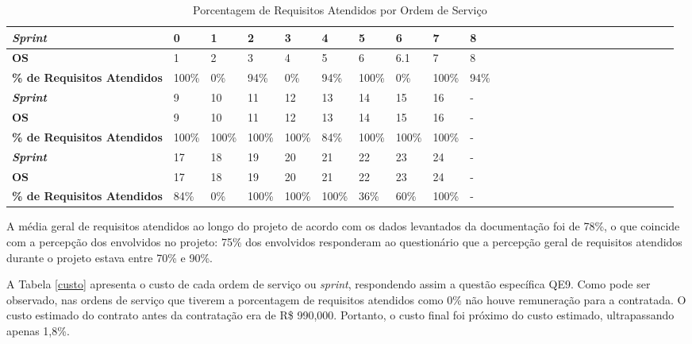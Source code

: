 \begin{table}[h]
\footnotesize
\center
\begin{tabular}{|l|l|l|l|l|l|l|l|l|l|l|l|l|l|l|l|l|l|l|l|l|l|l|l|l|l|}
\hline
\textbf{\textit{Sprint}} & 0   & 1 &  2 & 3 & 4 & 5 & 6 & 7 & 8  \\ \hline
\textbf{OS} & 1 &  2 & 3 & 4 & 5 & 6 & 6.1 & 7 & 8  \\ \hline
\textbf{\% de Requisitos Atendidos} & 100\% &  0\%    & 94\%    & 0\%    & 94\%         & 100\%        & 0\%       & 100\%                                                                                     & 94\%               \\ \hline \hline
\textbf{\textit{Sprint}} &  9 & 10 & 11 & 12 & 13 & 14 & 15 & 16  & -\\ \hline
\textbf{OS} &  9 & 10 & 11 & 12 & 13 & 14 & 15 & 16 & - \\ \hline
\textbf{\% de Requisitos Atendidos} &   100\%                                       & 100\%           & 100\%  & 100\% & 84\%         & 100\%         & 100\%       & 100\%  &-         \\ \hline \hline
\textbf{\textit{Sprint}} &  17 & 18 & 19 & 20 & 21 & 22 & 23 & 24  & -\\ \hline
\textbf{OS} &  17 & 18 & 19 & 20 & 21 & 22 & 23 & 24 & - \\ \hline
\textbf{\% de Requisitos Atendidos} &  84\%        & 0\%        & 100\%          & 100\% & 100\%     & 36\%      & 60\%        & 100\%          &-                                                                          \\ \hline

\end{tabular}
\caption{Porcentagem de Requisitos Atendidos por Ordem de Serviço}
		\label{porcentagemrequisitos}
\end{table}

 A média geral de requisitos atendidos ao longo do projeto de acordo com os dados levantados da documentação foi de 78\%, o que coincide com a percepção dos envolvidos no projeto: 75\% dos envolvidos responderam ao questionário que a percepção geral de requisitos atendidos durante o projeto estava entre 70\% e 90\%.

A Tabela \ref{custo} apresenta o custo de cada ordem de serviço ou \textit{sprint}, respondendo assim a questão específica QE9. Como pode ser observado, nas ordens de serviço que tiverem a porcentagem de requisitos atendidos como 0\% não houve remuneração para a contratada. O custo estimado do contrato antes da contratação era de R\$ 990,000. Portanto, o custo final foi próximo do custo estimado, ultrapassando apenas 1,8\%.


